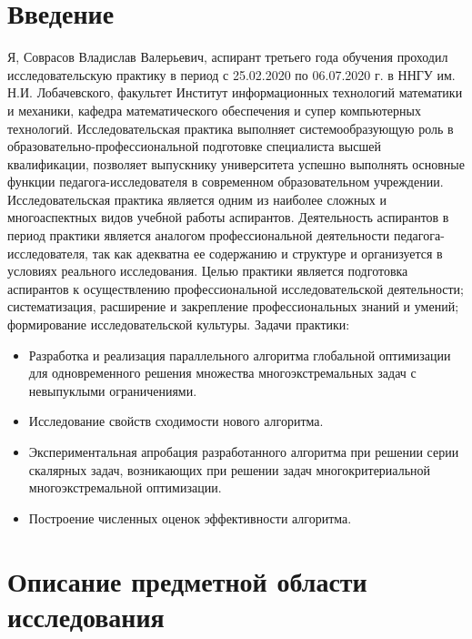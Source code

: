 \section{Введение}

Я, Соврасов Владислав Валерьевич, аспирант третьего года обучения проходил исследовательскую
практику в период с 25.02.2020 по 06.07.2020 г. в ННГУ им. Н.И. Лобачевского, факультет
Институт информационных технологий математики и механики, кафедра математического обеспечения и супер компьютерных технологий.
Исследовательская практика выполняет системообразующую роль в образовательно-профессиональной подготовке специалиста высшей квалификации, позволяет выпускнику университета успешно выполнять основные функции педагога-исследователя в современном образовательном учреждении.
Исследовательская практика является одним из наиболее сложных и многоаспектных видов учебной работы аспирантов. Деятельность аспирантов в период практики является аналогом профессиональной деятельности педагога-исследователя, так как адекватна ее содержанию и структуре и организуется в условиях реального исследования.
Целью практики является подготовка аспирантов к осуществлению профессиональной исследовательской деятельности; систематизация, расширение и закрепление профессиональных знаний и умений; формирование исследовательской культуры.
Задачи практики:
\begin{itemize}
  \item Разработка и реализация параллельного алгоритма глобальной оптимизации
  для одновременного решения множества многоэкстремальных задач с
  невыпуклыми ограничениями.
  \item Исследование свойств сходимости нового алгоритма.
  \item Экспериментальная апробация разработанного алгоритма при
решении серии скалярных задач, возникающих при решении задач
многокритериальной многоэкстремальной оптимизации.
  \item Построение численных оценок эффективности алгоритма.
\end{itemize}

\section{Описание предметной области исследования}

